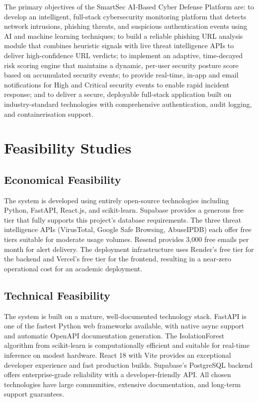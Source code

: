 The primary objectives of the SmartSec AI-Based Cyber Defense Platform are: to develop an intelligent, full-stack cybersecurity monitoring platform that detects network intrusions, phishing threats, and suspicious authentication events using AI and machine learning techniques; to build a reliable phishing URL analysis module that combines heuristic signals with live threat intelligence APIs to deliver high-confidence URL verdicts; to implement an adaptive, time-decayed risk scoring engine that maintains a dynamic, per-user security posture score based on accumulated security events; to provide real-time, in-app and email notifications for High and Critical security events to enable rapid incident response; and to deliver a secure, deployable full-stack application built on industry-standard technologies with comprehensive authentication, audit logging, and containerisation support.

\section{Feasibility Studies}

\subsection*{Economical Feasibility}

The system is developed using entirely open-source technologies including Python, FastAPI, React.js, and scikit-learn. Supabase provides a generous free tier that fully supports this project's database requirements. The three threat intelligence APIs (VirusTotal, Google Safe Browsing, AbuseIPDB) each offer free tiers suitable for moderate usage volumes. Resend provides 3,000 free emails per month for alert delivery. The deployment infrastructure uses Render's free tier for the backend and Vercel's free tier for the frontend, resulting in a near-zero operational cost for an academic deployment.

\subsection*{Technical Feasibility}

The system is built on a mature, well-documented technology stack. FastAPI is one of the fastest Python web frameworks available, with native async support and automatic OpenAPI documentation generation. The IsolationForest algorithm from scikit-learn is computationally efficient and suitable for real-time inference on modest hardware. React 18 with Vite provides an exceptional developer experience and fast production builds. Supabase's PostgreSQL backend offers enterprise-grade reliability with a developer-friendly API. All chosen technologies have large communities, extensive documentation, and long-term support guarantees.

